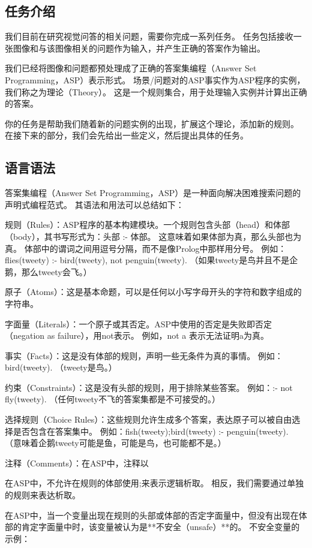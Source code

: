 \subsection{任务介绍}
我们目前在研究视觉问答的相关问题，需要你完成一系列任务。
任务包括接收一张图像和与该图像相关的问题作为输入，并产生正确的答案作为输出。

我们已经将图像和问题都预处理成了正确的答案集编程（Answer Set Programming，ASP）表示形式。
场景/问题对的ASP事实作为ASP程序的实例，我们称之为理论（Theory）。
这是一个规则集合，用于处理输入实例并计算出正确的答案。

你的任务是帮助我们随着新的问题实例的出现，扩展这个理论，添加新的规则。
在接下来的部分，我们会先给出一些定义，然后提出具体的任务。
\subsection{语言语法}
答案集编程（Answer Set Programming，ASP）是一种面向解决困难搜索问题的声明式编程范式。
其语法和用法可以总结如下：

规则（Rules）：ASP程序的基本构建模块。一个规则包含头部（head）和体部（body），其书写形式为：头部 :- 体部。
这意味着如果体部为真，那么头部也为真。
体部中的谓词之间用逗号分隔，而不是像Prolog中那样用分号。
例如：flies(tweety) :- bird(tweety), not penguin(tweety). （如果tweety是鸟并且不是企鹅，那么tweety会飞。）

原子（Atoms）：这是基本命题，可以是任何以小写字母开头的字符和数字组成的字符串。

字面量（Literals）：一个原子或其否定。ASP中使用的否定是失败即否定（negation as failure），用not表示。
例如，not a 表示无法证明a为真。

事实（Facts）：这是没有体部的规则，声明一些无条件为真的事情。
例如：bird(tweety). （tweety是鸟。）

约束（Constraints）：这是没有头部的规则，用于排除某些答案。
例如：:- not fly(tweety). （任何tweety不飞的答案集都是不可接受的。）

选择规则（Choice Rules）：这些规则允许生成多个答案，表达原子可以被自由选择是否包含在答案集中。
例如：{fish(tweety);bird(tweety)} :- penguin(tweety). （意味着企鹅tweety可能是鱼，可能是鸟，也可能都不是。）

注释（Comments）：在ASP中，注释以%

在ASP中，不允许在规则的体部使用;来表示逻辑析取。
相反，我们需要通过单独的规则来表达析取。

在ASP中，当一个变量出现在规则的头部或体部的否定字面量中，但没有出现在体部的肯定字面量中时，该变量被认为是**不安全（unsafe）**的。
不安全变量的示例：

